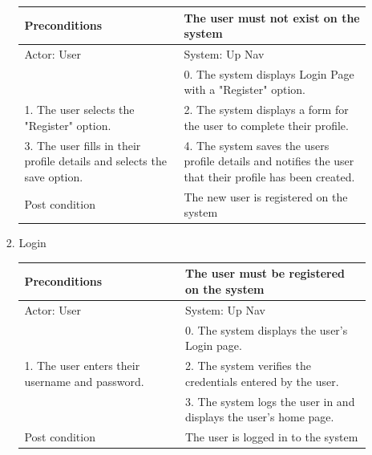 \documentclass{article}
\begin{document}
\begin{enumerate}
\begin{center}
\begin{enumerate}
\begin{enumerate}
	\begin{table}[H]
	\centering
		\begin{tabular}{ | p{15em} | p{15em}| }
		\hline
		Preconditions                                                       				& The user must not exist on the system \\ 				
		\hline
		Actor: User                                                       					& System: Up Nav \\ 			
		\hline
                                                                  							& 0. The system displays Login Page with a "Register" option. \\                                                           
		 \hline
		1. The user selects the "Register" option.					& 2.  The system displays a form for the user to complete their profile. \\				
		\hline
		3. The user fills in their profile details and selects the save option. 		& 4. The system saves the users profile details and notifies the user that their profile has been created. \\ 
		\hline
		Post condition                                                     				& The new user is registered on the system \\ 				
		\hline
		\end{tabular}
	\end{table}

	\item{Login}

	\begin{table}[H]
	\centering
		\begin{tabular}{ | p{15em} | p{15em}| }
		\hline
		Preconditions                                    												& The user must be registered on the system \\ 
		\hline
		Actor: User                                     												& System: Up Nav \\ 
		\hline
                                               		 													& 0. The system displays the user's Login page. \\ 
		\hline
		1. The user enters their username and password. 										& 2. The system verifies the credentials entered by the user. \\
		\hline
                                                															& 3. The system logs the user in and displays the user's home page. \\
		\hline
		Post condition                                  												& The user is logged in to the system \\ 
		\hline
		\end{tabular}
	\end{table}


\end{enumerate}
\end{enumerate}
\end{center}
\end{enumerate}
\end{document}
